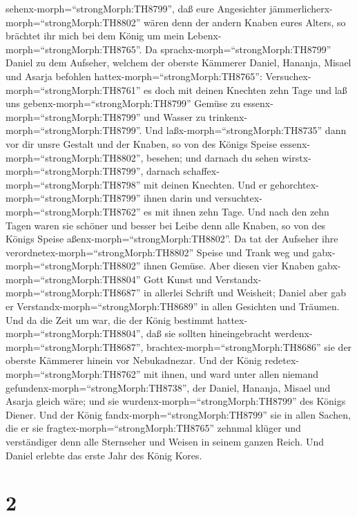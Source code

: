 sehenx-morph=``strongMorph:TH8799'', daß eure Angesichter
jämmerlicherx-morph=``strongMorph:TH8802'' wären denn der andern Knaben
eures Alters, so brächtet ihr mich bei dem König um mein
Lebenx-morph=``strongMorph:TH8765''.  Da
sprachx-morph=``strongMorph:TH8799'' Daniel zu dem Aufseher, welchem der
oberste Kämmerer Daniel, Hananja, Misael und Asarja befohlen
hattex-morph=``strongMorph:TH8765'': 
Versuchex-morph=``strongMorph:TH8761'' es doch mit deinen Knechten zehn
Tage und laß uns gebenx-morph=``strongMorph:TH8799'' Gemüse zu
essenx-morph=``strongMorph:TH8799'' und Wasser zu
trinkenx-morph=``strongMorph:TH8799''.  Und
laßx-morph=``strongMorph:TH8735'' dann vor dir unsre Gestalt und der
Knaben, so von des Königs Speise essenx-morph=``strongMorph:TH8802'',
besehen; und darnach du sehen wirstx-morph=``strongMorph:TH8799'',
darnach schaffex-morph=``strongMorph:TH8798'' mit deinen Knechten.
 Und er gehorchtex-morph=``strongMorph:TH8799'' ihnen darin
und versuchtex-morph=``strongMorph:TH8762'' es mit ihnen zehn Tage.
 Und nach den zehn Tagen waren sie schöner und besser bei
Leibe denn alle Knaben, so von des Königs Speise
aßenx-morph=``strongMorph:TH8802''.  Da tat der Aufseher
ihre verordnetex-morph=``strongMorph:TH8802'' Speise und Trank weg und
gabx-morph=``strongMorph:TH8802'' ihnen Gemüse.  Aber
diesen vier Knaben gabx-morph=``strongMorph:TH8804'' Gott Kunst und
Verstandx-morph=``strongMorph:TH8687'' in allerlei Schrift und Weisheit;
Daniel aber gab er Verstandx-morph=``strongMorph:TH8689'' in allen
Gesichten und Träumen.  Und da die Zeit um war, die der
König bestimmt hattex-morph=``strongMorph:TH8804'', daß sie sollten
hineingebracht werdenx-morph=``strongMorph:TH8687'',
brachtex-morph=``strongMorph:TH8686'' sie der oberste Kämmerer hinein
vor Nebukadnezar.  Und der König
redetex-morph=``strongMorph:TH8762'' mit ihnen, und ward unter allen
niemand gefundenx-morph=``strongMorph:TH8738'', der Daniel, Hananja,
Misael und Asarja gleich wäre; und sie
wurdenx-morph=``strongMorph:TH8799'' des Königs Diener. 
Und der König fandx-morph=``strongMorph:TH8799'' sie in allen Sachen,
die er sie fragtex-morph=``strongMorph:TH8765'' zehnmal klüger und
verständiger denn alle Sternseher und Weisen in seinem ganzen Reich.
 Und Daniel erlebte das erste Jahr des König Kores.

\hypertarget{section-1}{%
\section{2}\label{section-1}}


